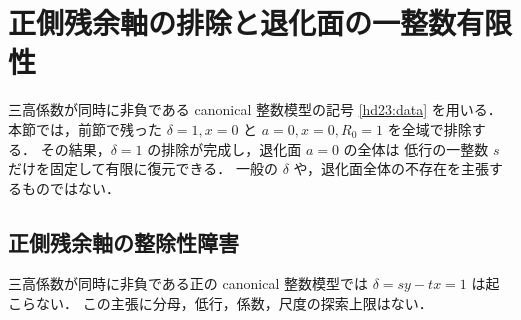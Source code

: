 \section{正側残余軸の排除と退化面の一整数有限性}
\label{ax24:section}

三高係数が同時に非負である canonical 整数模型の記号
\eqref{hd23:data} を用いる．本節では，前節で残った
$\delta=1,x=0$ と $a=0,x=0,R_0=1$ を全域で排除する．
その結果，$\delta=1$ の排除が完成し，退化面 $a=0$ の全体は
低行の一整数 $s$ だけを固定して有限に復元できる．
一般の $\delta$ や，退化面全体の不存在を主張するものではない．

\subsection{正側残余軸の整除性障害}

\begin{theorem}[非対称量一の完全排除]
\label{ax24:positive-axis}
三高係数が同時に非負である正の canonical 整数模型では
$\delta=sy-tx=1$ は起こらない．
この主張に分母，低行，係数，尺度の探索上限はない．
\end{theorem}

